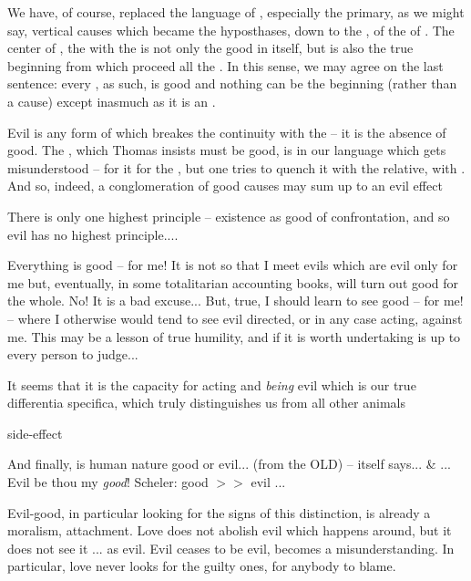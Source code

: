 We have, of course, replaced the language of , especially the
primary, as we might say, vertical causes which became the hyposthases, down to
the , of the  of . The center
of , the  with the  is not only the
good in itself, but is also the true beginning from which proceed all the
. In this sense, we may agree on the last sentence: every
, as such, is good and nothing can be the beginning (rather than a
cause) except inasmuch as it is an . 

Evil is any form of  which breakes the continuity with the
 -- it is the absence of good. The , which Thomas insists must be good, is in our language
 which gets misunderstood -- for it  for the , but one tries to quench it with the relative, with . And
so, indeed, a conglomeration of good causes may sum up to an evil effect

There is only one highest principle -- existence as good of confrontation, and
so evil has no highest principle....

\say Everything is good -- for me! It is not so that I meet evils which are evil
only for me but, eventually, in some totalitarian accounting books, will turn
out good for the whole. No! It is a bad excuse... But, true, I should learn to
see good -- for me! -- where I otherwise would tend to see evil directed, or in
any case acting, against me. This may be a lesson of true humility, and if it is
worth undertaking is up to every person to judge...


\kom
It seems that it is the capacity for acting and {\em
  being} evil which is our true differentia specifica, which truly distinguishes
  us from all other animals 


  
\label{morals}
side-effect

And finally, 
is human nature good or evil... (from the OLD) --  itself says...
\& ... Evil be thou my {\em good}! Scheler: good $>>$ evil ...

\pa\label{kom:noEvil}
Evil-good, in particular looking for the signs of this distinction, is already a
moralism, attachment. Love does not abolish evil which happens around, but it
does not see it ... as evil. Evil ceases to be evil, becomes a
misunderstanding. In particular, love never looks for the guilty ones, for
anybody to blame.

